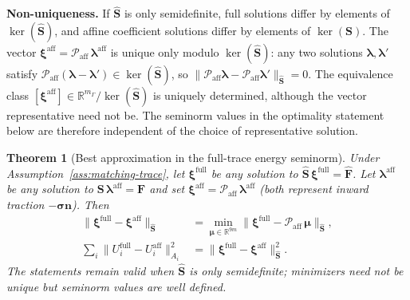 \documentclass[11pt,a4paper]{article}
\newtheorem{theorem}[assumption]{Theorem}
\newcommand{\R}{\mathbb{R}}
\newcommand{\stress}{\bm{\sigma}}
\newcommand{\normal}{\bm{n}}
\newcommand{\trac}{\bm{\lambda}}
\newcommand{\Schur}{\mathbf{S}}
\begin{document}
  \textbf{Non-uniqueness.}
  If $\widehat{\Schur}$ is only semidefinite, full solutions differ
  by elements of $\ker(\widehat{\Schur})$, and affine coefficient
  solutions differ by elements of $\ker(\Schur)$.
  The vector $\bm{\xi}^{\text{aff}} = \mathcal{P}_{\text{aff}}\,
  \trac^{\text{aff}}$ is unique only modulo $\ker(\widehat{\Schur})$:
  any two solutions $\trac,\trac'$ satisfy
  $\mathcal{P}_{\text{aff}}(\trac-\trac')
  \in \ker(\widehat{\Schur})$, so
  $\|\mathcal{P}_{\text{aff}}\trac
    - \mathcal{P}_{\text{aff}}\trac'\|_{\widehat{\Schur}} = 0$.
  The equivalence class
  $[\bm{\xi}^{\text{aff}}] \in \R^{m_\Gamma}/\ker(\widehat{\Schur})$
  is uniquely determined, although the vector representative need not be.
  The seminorm values in the optimality statement below are therefore
  independent of the choice of representative solution.

\begin{theorem}[Best approximation in the full-trace energy seminorm]\label{thm:galerkin}
  Under Assumption~\ref{ass:matching-trace}, let
  $\bm{\xi}^{\text{full}}$ be any solution to
  $\widehat{\Schur}\,\bm{\xi}^{\text{full}} = \widehat{\bm{F}}$.
  Let $\trac^{\text{aff}}$ be any solution to
  $\Schur\,\trac^{\text{aff}} = \bm{F}$ and set
  $\bm{\xi}^{\text{aff}} = \mathcal{P}_{\text{aff}}\,\trac^{\text{aff}}$
  (both represent inward traction $-\stress\normal$).
  Then
  \begin{align}
    \|\bm{\xi}^{\text{full}} - \bm{\xi}^{\text{aff}}\|_{\widehat{\Schur}}
    &= \min_{\bm{\mu}\in\R^{9m}}
       \|\bm{\xi}^{\text{full}}
         - \mathcal{P}_{\text{aff}}\,\bm{\mu}\|_{\widehat{\Schur}},\label{eq:best}\\
    \sum_i \|U_i^{\text{full}} - U_i^{\text{aff}}\|_{A_i}^2
    &= \|\bm{\xi}^{\text{full}}
       - \bm{\xi}^{\text{aff}}\|_{\widehat{\Schur}}^2.\label{eq:vel-err}
  \end{align}
  The statements remain valid when $\widehat{\Schur}$ is only semidefinite;
  minimizers need not be unique but seminorm values are well defined.
\end{theorem}
\end{document}
